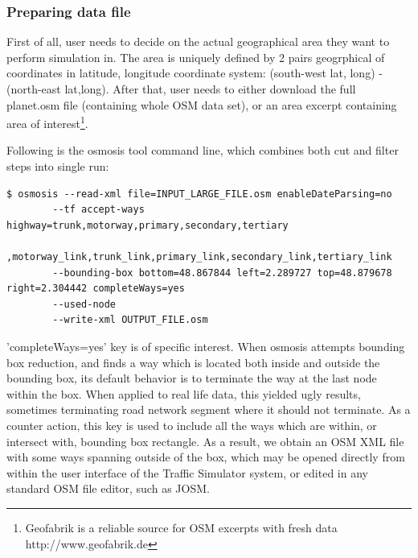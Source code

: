 \subsubsection{Preparing data file}
First of all, user needs to decide on the actual geographical area they want to perform simulation in. The area is uniquely defined by 2 pairs geogrphical of coordinates in latitude, longitude coordinate system: (south-west lat, long) - (north-east lat,long). After that, user needs to either download the full planet.osm file (containing whole OSM data set), or an area excerpt containing area of interest\footnote{Geofabrik is a reliable source for OSM excerpts with fresh data http://www.geofabrik.de}.

Following is the osmosis tool command line, which combines both cut and filter steps into single run:
\begin{lstlisting}
$ osmosis --read-xml file=INPUT_LARGE_FILE.osm enableDateParsing=no
        --tf accept-ways highway=trunk,motorway,primary,secondary,tertiary
            ,motorway_link,trunk_link,primary_link,secondary_link,tertiary_link
        --bounding-box bottom=48.867844 left=2.289727 top=48.879678 right=2.304442 completeWays=yes
        --used-node
        --write-xml OUTPUT_FILE.osm
\end{lstlisting}
'completeWays=yes' key is of specific interest. When osmosis attempts bounding box reduction, and finds a way which is located both inside and outside the bounding box, its default behavior is to terminate the way at the last node within the box. When applied to real life data, this yielded ugly results, sometimes terminating road network segment where it should not terminate. As a counter action, this key is used to include all the ways which are within, or intersect with, bounding box rectangle.  As a result, we obtain an OSM XML file with some ways spanning outside of the box, which may be opened directly from within the user interface of the Traffic Simulator system, or edited in any standard OSM file editor, such as JOSM.

